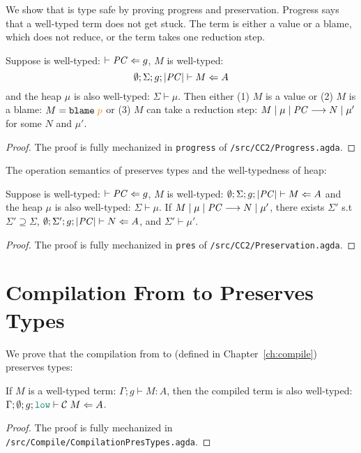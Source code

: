 We show that \CC is type safe by proving progress and preservation. Progress
says that a well-typed \CC term does not get stuck. The term is either a value
or a blame, which does not reduce, or the term takes one reduction step.

\begin{theorem}[Progress]
\label{thm:progress}
Suppose \PC is well-typed: $\vdash \mathit{PC} \Leftarrow g$,
$M$ is well-typed:
\[
\emptyset ; \Sigma ; g ; | \mathit{PC} | \vdash M \Leftarrow A
\]
and the heap $\mu$ is also well-typed: $\Sigma \vdash \mu$.
Then either (1) $M$ is a value or (2) $M$ is a blame: {\normalfont $M = \blame{p}$}
or (3) $M$ can take a reduction step:
${M}\mid{\mu}\mid{\ensuremath{\mathit{PC}}}\longrightarrow{N}\mid{\mu'}$ for some $N$ and $\mu'$.
\end{theorem}
\begin{proof}
  The proof is fully mechanized in \texttt{progress} of \texttt{/src/CC2/Progress.agda}.
\end{proof}

The operation semantics of \CC preserves types and the well-typedness of heap:

\begin{theorem}[Preservation]
\label{thm:preservation}
Suppose \PC is well-typed:  $\vdash \mathit{PC} \Leftarrow g$,
$M$ is well-typed: $\emptyset ; \Sigma ; g ; |\mathit{PC}| \vdash M \Leftarrow A$
and the heap $\mu$ is also well-typed: $\Sigma \vdash \mu$.
If ${M}\mid{\mu}\mid{\ensuremath{\mathit{PC}}}\longrightarrow{N}\mid{\mu'}$, there exists $\Sigma'$ s.t
$\Sigma' \supseteq \Sigma$, $\emptyset ; \Sigma' ; g ; |\mathit{PC}| \vdash N \Leftarrow A$,
and $\Sigma' \vdash \mu'$.
\end{theorem}
\begin{proof}
  The proof is fully mechanized in \texttt{pres} of \texttt{/src/CC2/Preservation.agda}.
\end{proof}

\section{Compilation From \CC to \Surface Preserves Types}
\label{sec:compile-pres}

We prove that the compilation from \Surface to \CC (defined in
Chapter~\ref{ch:compile}) preserves types:

\begin{theorem}
  \label{thm:compile-pres}
  If $M$ is a well-typed \Surface term: $\Gamma ; g \vdash M : A$, then the
  compiled \CC term is also well-typed: $\Gamma ; \emptyset ; g ; \low \vdash
  \compile{M} \Leftarrow A$.
\end{theorem}
\begin{proof}
  The proof is fully mechanized in
  \texttt{/src/Compile/CompilationPresTypes.agda}.
\end{proof}

